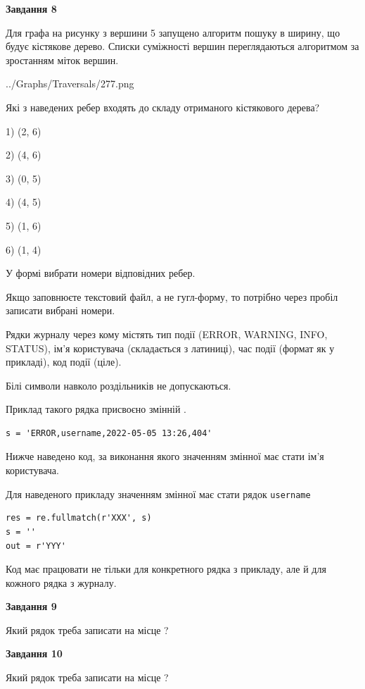\documentclass[12pt, ukrainian]{article}
\def\code#1{\Verb!#1!}
\begin{document}
{\begin {large}
{\begin {center}\textbf{Завдання 8}\end {center}}\par
Для графа на рисунку з вершини 5 запущено алгоритм пошуку в ширину, що будує кістякове дерево. Списки суміжності вершин переглядаються алгоритмом за зростанням міток вершин.\par
\begin{center}
	{../Graphs/Traversals/277.png}
\end{center}
\par Які з наведених ребер входять до складу отриманого кістякового дерева?\par
1) (2, 6)\par
2) (4, 6)\par
3) (0, 5)\par
4) (4, 5)\par
5) (1, 6)\par
6) (1, 4)\par
{\vskip 15pt} У формі вибрати номери відповідних ребер.


Якщо заповнюєте текстовий файл, а не гугл-форму, то потрібно через пробіл записа\-ти вибрані номери.\par
\newpage


Рядки журналу через кому містять тип події (ERROR, WARNING, INFO, STATUS), ім'я користувача (складається з латиниці), час події (фор\-мат як у прикладі), код події (ціле).

Білі символи навколо роздільників не допускаються.

Приклад такого рядка присвоєно змінній .



\begin{verbatim}
s = 'ERROR,username,2022-05-05 13:26,404'
\end{verbatim}


Нижче наведено код, за виконання якого значенням змінної  має стати ім'я користувача.

Для наведеного прикладу значенням змінної  має стати рядок \code{username}



\begin{verbatim}
res = re.fullmatch(r'XXX', s)
s = ''
out = r'YYY'
\end{verbatim}


Код має працювати не тільки для конкретного рядка з прикладу, але й для кожного рядка з журналу.

{\begin {center}\textbf{Завдання 9}\end {center}}\par
Який рядок треба записати на місце  ?\par
\vspace{5mm}


{\begin {center}\textbf{Завдання 10}\end {center}}\par
Який рядок треба записати на місце  ?\par


\newpage


\end {large}}
\end{document}
